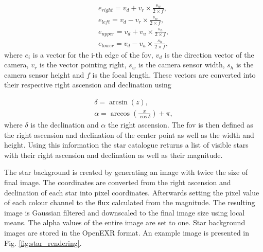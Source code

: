 \begin{align}
    e_{right} = v_d + v_r \times \frac{s_w}{2 \times f}, \label{eq:edge_right} \\
    e_{left} = v_d - v_r \times \frac{s_w}{2 \times f}, \label{eq:edge_left} \\
    e_{upper} = v_d + v_u \times \frac{s_h}{2 \times f}, \label{eq:edge_upper} \\
    e_{lower} = v_d - v_u \times \frac{s_h}{2 \times f}, \label{eq:edge_lower}
\end{align}
where $e_{i}$ is a vector for the i-th edge of the \gls{fov}, $v_d$ is the direction vector of the camera, $v_r$ is the vector pointing right, $s_w$ is the camera sensor width, $s_h$ is the camera sensor height and $f$ is the focal length. These vectors are converted into their respective right ascension and declination using

\begin{align}
    \delta = \arcsin{(z)}, \label{eq:declination} \\
    \alpha = \arccos{\left(\frac{x}{\cos{\delta}}\right)} + \pi, \label{eq:right_ascension}
\end{align}
where $\delta$ is the declination and $\alpha$ the right ascension. The \gls{fov} is then defined as the right ascension and declination of the center point as well as the width and height. Using this information the star catalogue returns a list of visible stars with their right ascension and declination as well as their magnitude.

The star background is created by generating an image with twice the size of final image. The coordinates are converted from the right ascension and declination of each star into pixel coordinates. Afterwards setting the pixel value of each colour channel to the flux calculated from the magnitude. The resulting image is Gaussian filtered and downscaled to the final image size using local means. The alpha values of the entire image are set to one. Star background images are stored in the OpenEXR format. An example image is presented in Fig. \ref{fig:star_rendering}.

